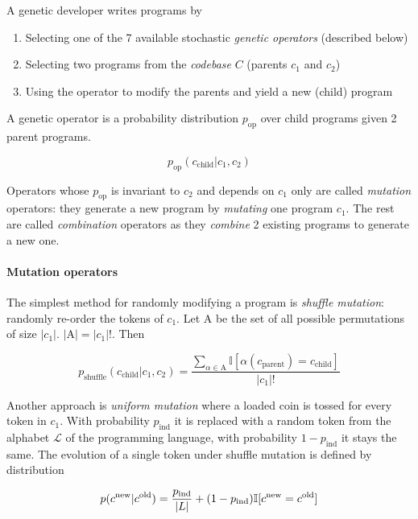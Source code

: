 
A genetic developer writes programs by
\begin{enumerate}
    \item Selecting one of the 7 available stochastic \emph{genetic operators} (described below)
    \item Selecting two programs from the \emph{codebase} $C$ (parents $c_1$ and $c_2$) 
    \item Using the operator to modify the parents and yield a new (child) program
\end{enumerate}

A genetic operator is a probability distribution $p_\text{op}$ over child programs given 2 parent programs. 

\begin{equation}
    p_\text{op}(c_\text{child}|c_1,c_2)
\end{equation}

Operators whose $p_\text{op}$ is invariant to $c_2$ and depends on $c_1$ only are called \emph{mutation} operators: they generate a new program by \emph{mutating} one program $c_1$.
The rest are called \emph{combination} operators as they \emph{combine} 2 existing programs to generate a new one.



\paragraph{Mutation operators}

The simplest method for randomly modifying a program is \emph{shuffle mutation}: randomly re-order the tokens of $c_1$.
Let $\mathrm{A}$ be the set of all possible permutations of size $|c_1|$. $|\mathrm{A}|=|c_1|!$. 
Then

\begin{equation}
    p_\text{shuffle}(c_\text{child}|c_1,c_2) =
            \frac{\sum\limits_{\alpha \in \mathrm{A}} \mathbb{I}[\alpha(c_\text{parent}) = c_\text{child}]}{|c_1|!}
\end{equation}

Another approach is \emph{uniform mutation} where a loaded coin is tossed for every token in $c_1$. 
With probability $p_\text{ind}$ it is replaced with a random token from the alphabet $\mathcal{L}$ of the programming language, with probability $1-p_\text{ind}$ it stays the same.
The evolution of a single token under shuffle mutation is defined by distribution

\begin{equation}
    p(c^\text{new} | c^\text{old}) = \frac{p_\text{ind}}{|L|} +  (1 - p_\text{ind}) \mathbb{I}[c^\text{new} = c^\text{old}]
\end{equation}

